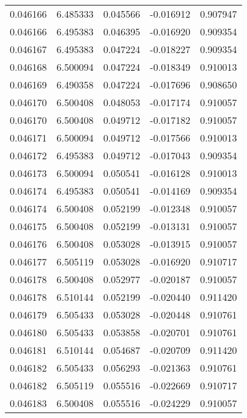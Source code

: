 \begin{tabular}{lrrrr}
0.046166    &  6.485333 &  0.045566 & -0.016912 &             0.907947 \\
0.046166    &  6.495383 &  0.046395 & -0.016920 &             0.909354 \\
0.046167    &  6.495383 &  0.047224 & -0.018227 &             0.909354 \\
0.046168    &  6.500094 &  0.047224 & -0.018349 &             0.910013 \\
0.046169    &  6.490358 &  0.047224 & -0.017696 &             0.908650 \\
0.046170    &  6.500408 &  0.048053 & -0.017174 &             0.910057 \\
0.046170    &  6.500408 &  0.049712 & -0.017182 &             0.910057 \\
0.046171    &  6.500094 &  0.049712 & -0.017566 &             0.910013 \\
0.046172    &  6.495383 &  0.049712 & -0.017043 &             0.909354 \\
0.046173    &  6.500094 &  0.050541 & -0.016128 &             0.910013 \\
0.046174    &  6.495383 &  0.050541 & -0.014169 &             0.909354 \\
0.046174    &  6.500408 &  0.052199 & -0.012348 &             0.910057 \\
0.046175    &  6.500408 &  0.052199 & -0.013131 &             0.910057 \\
0.046176    &  6.500408 &  0.053028 & -0.013915 &             0.910057 \\
0.046177    &  6.505119 &  0.053028 & -0.016920 &             0.910717 \\
0.046178    &  6.500408 &  0.052977 & -0.020187 &             0.910057 \\
0.046178    &  6.510144 &  0.052199 & -0.020440 &             0.911420 \\
0.046179    &  6.505433 &  0.053028 & -0.020448 &             0.910761 \\
0.046180    &  6.505433 &  0.053858 & -0.020701 &             0.910761 \\
0.046181    &  6.510144 &  0.054687 & -0.020709 &             0.911420 \\
0.046182    &  6.505433 &  0.056293 & -0.021363 &             0.910761 \\
0.046182    &  6.505119 &  0.055516 & -0.022669 &             0.910717 \\
0.046183    &  6.500408 &  0.055516 & -0.024229 &             0.910057 \\

\end{tabular}
